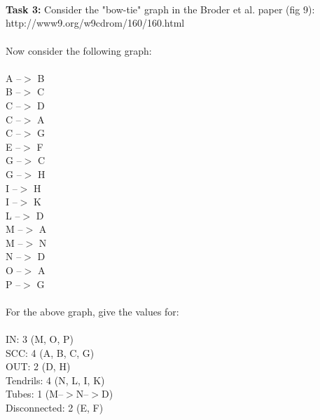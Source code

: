 \documentclass{article}
\begin{document}
		\\\\\\
		\textbf{Task 3:} Consider the "bow-tie" graph in the Broder et al. paper (fig 9):\\
		http://www9.org/w9cdrom/160/160.html\\\\
		Now consider the following graph:\\\\
		A --$>$ B\\
		B --$>$ C\\
		C --$>$ D\\
		C --$>$ A\\
		C --$>$ G\\
		E --$>$ F\\
		G --$>$ C\\
		G --$>$ H\\
		I --$>$ H\\
		I --$>$ K\\
		L --$>$ D\\
		M --$>$ A\\
		M --$>$ N\\
		N --$>$ D\\
		O --$>$ A\\
		P --$>$ G\\\\
		For the above graph, give the values for:\\\\
		IN: 3 (M, O, P)\\
		SCC: 4 (A, B, C, G)\\
		OUT: 2 (D, H)\\
		Tendrils: 4 (N, L, I, K)\\ 
		Tubes: 1 (M--$>$N--$>$D)\\
		Disconnected: 2 (E, F)\\
	
\end{document}
